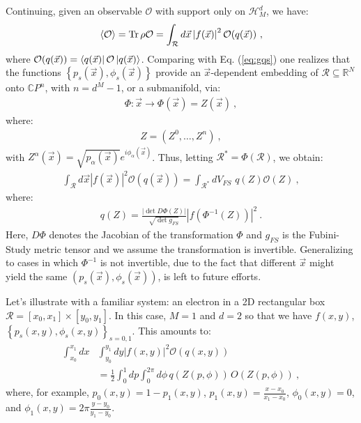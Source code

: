 \documentclass[nofootinbib,pre,twocolumn,showpacs,showkeys,groupaddress,preprintnumbers,floatfix]{revtex4-1}
\newcommand{\1}{\mathbbm{1}}
\newcommand{\MV}[1]{\left\langle #1 \right\rangle}
\begin{document}
Continuing, given an observable $\mathcal{O}$ with support only on
$\mathcal{H}^d_M$, we have:
\begin{align*}
\MV{\mathcal{O}}
  = \Tr \rho \mathcal{O} = \int_{\mathcal{R}} d\vec{x}
  \left\vert f(\vec{x})\right\vert^2 \mathcal{O}({q(\vec{x})})
  ~,
\end{align*}
where $\mathcal{O}({q(\vec{x})}) = \bra{q(\vec{x})}\mathcal{O}
\ket{q(\vec{x})}$. Comparing with Eq. (\ref{eq:gqs})
one realizes that the functions $\left\{p_s(\vec{x}),\phi_s(\vec{x})\right\}$ provide an $\vec{x}$-dependent embedding of 
$\mathcal{R} \subseteq \mathbb{R}^N$ onto $\mathbb{C}P^n$, with $n=d^M-1$, or
a submanifold, via:
\begin{align*}
\Phi : \vec{x} \to \Phi(\vec{x}) = Z(\vec{x})
  ~,
\end{align*}
where:
\begin{align*}
Z = (Z^0,\ldots,Z^n)
  ~,
\end{align*}
with $Z^\alpha(\vec{x}) = \sqrt{p_\alpha(\vec{x})}e^{i\phi_\alpha(\vec{x})}$.
Thus, letting $\mathcal{R}^{*} = \Phi(\mathcal{R})$, we obtain:
\begin{align*}
\int_{\mathcal{R}} d\vec{x} \left\vert f(\vec{x})\right\vert^2 \mathcal{O}({q(\vec{x})}) = \int_{\mathcal{R}^{*}} dV_{FS} \,\, q(Z) \mathcal{O}(Z)
  ~,
\end{align*}
where:
\begin{align*}
q(Z) = \frac{\left\vert \det D\Phi (Z)
  \right\vert }{\sqrt{\det g_{FS}}} \left\vert f(\Phi^{-1}(Z)) \right\vert^2
  ~.
\end{align*}
Here, $D\Phi$ denotes the Jacobian of the transformation $\Phi$ and $g_{FS}$ is
the Fubini-Study metric tensor and we assume the transformation is invertible.
Generalizing to cases in which $\Phi^{-1}$ is not invertible, due to the fact
that different $\vec{x}$ might yield the same $\left(
p_s(\vec{x}),\phi_s(\vec{x})\right)$, is left to future efforts.

Let's illustrate with a familiar system: an electron in a 2D rectangular box
$\mathcal{R} = [x_0,x_1] \times [y_0,y_1]$. In this case, $M=1$ and $d=2$ so
that we have $f(x,y)$, $\left\{p_s(x,y), \phi_s(x,y)\right\}_{s=0,1}$. This
amounts to:
\begin{align*}
\int_{x_0}^{x_1} \!\!\! dx & \int_{y_0}^{y_1} \!\!\!dy
  |f(x,y)|^2 \mathcal{O}(q(x,y)) \\
  & = \frac{1}{2}\int_0^1 \!\!\!dp \int_0^{2\pi}\!\!\!\!\!d\phi \, q(Z(p,\phi)) \, O(Z(p,\phi))
  ~,
\end{align*}
where, for example, $p_0(x,y) = 1 - p_1(x,y)$, $p_1(x,y) = \frac{x -
x_0}{x_1-x_0}$, $\phi_0(x,y) = 0$, and $\phi_1(x,y) = 2\pi \frac{y -
y_0}{y_1-y_0}$.
\end{document}
